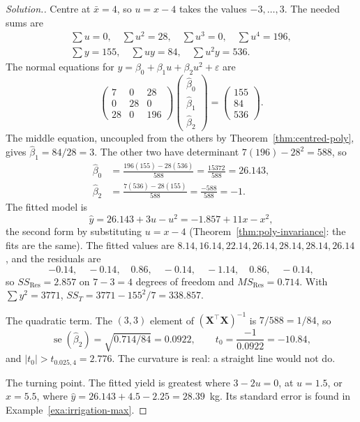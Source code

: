 \documentclass[11pt,a4paper]{article}
\numberwithin{equation}{section}
\theoremstyle{definition}
\newenvironment{solution}
  {\renewcommand{\qedsymbol}{}\begin{proof}[\textit{Solution}.]}
  {\end{proof}}
\begin{document}
\begin{solution}
Centre at $\bar x = 4$, so $u = x - 4$ takes the values $-3, \dots, 3$. The needed sums are
\begin{gather*}
\textstyle\sum u = 0, \quad \sum u^2 = 28, \quad \sum u^3 = 0, \quad \sum u^4 = 196, \\
\textstyle\sum y = 155, \quad \sum uy = 84, \quad \sum u^2y = 536 .
\end{gather*}
The normal equations for $y = \beta_0 + \beta_1u + \beta_2u^2 + \varepsilon$ are
\[
\begin{pmatrix} 7 & 0 & 28 \\ 0 & 28 & 0 \\ 28 & 0 & 196 \end{pmatrix}
\begin{pmatrix} \hat\beta_0 \\ \hat\beta_1 \\ \hat\beta_2 \end{pmatrix}
= \begin{pmatrix} 155 \\ 84 \\ 536 \end{pmatrix} .
\]
The middle equation, uncoupled from the others by Theorem~\ref{thm:centred-poly}, gives $\hat\beta_1 = 84/28 = 3$. The
other two have determinant $7(196) - 28^2 = 588$, so
\begin{align*}
\hat\beta_0 &= \frac{196(155) - 28(536)}{588} = \frac{15372}{588} = 26.143 , \\
\hat\beta_2 &= \frac{7(536) - 28(155)}{588} = \frac{-588}{588} = -1 .
\end{align*}
The fitted model is
\[
\hat y = 26.143 + 3u - u^2 = -1.857 + 11x - x^2 ,
\]
the second form by substituting $u = x - 4$ (Theorem~\ref{thm:poly-invariance}: the fits are the same). The fitted
values are $8.14, 16.14, 22.14, 26.14, 28.14, 28.14, 26.14$, and the residuals are
\[
-0.14, \quad -0.14, \quad 0.86, \quad -0.14, \quad -1.14, \quad 0.86, \quad -0.14 ,
\]
so $SS_{\mathrm{Res}} = 2.857$ on $7 - 3 = 4$ degrees of freedom and $MS_{\mathrm{Res}} = 0.714$. With $\sum y^2 = 3771$,
$SS_T = 3771 - 155^2/7 = 338.857$.

The quadratic term. The $(3,3)$ element of $(\mathbf{X}^\top\mathbf{X})^{-1}$ is $7/588 = 1/84$, so
\[
\operatorname{se}(\hat\beta_2) = \sqrt{0.714/84} = 0.0922, \qquad t_0 = \frac{-1}{0.0922} = -10.84 ,
\]
and $|t_0| > t_{0.025,4} = 2.776$. The curvature is real: a straight line would not do.

The turning point. The fitted yield is greatest where $3 - 2u = 0$, at $u = 1.5$, or $x = 5.5$, where
$\hat y = 26.143 + 4.5 - 2.25 = 28.39$~kg. Its standard error is found in Example~\ref{exa:irrigation-max}.
\end{solution}
\end{document}
